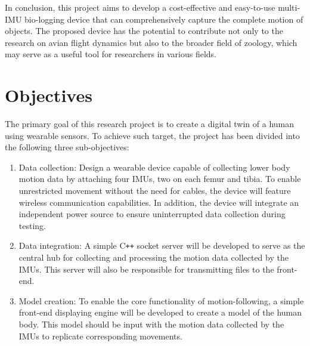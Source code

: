 In conclusion, this project aims to develop a cost-effective and easy-to-use multi-IMU bio-logging device that can comprehensively capture the complete motion of objects.
The proposed device has the potential to contribute not only to the research on avian flight dynamics but also to the broader field of zoology, which may serve as a useful tool for researchers in various fields.


\section{Objectives}
The primary goal of this research project is to create a digital twin of a human using wearable sensors.
To achieve such target, the project has been divided into the following three sub-objectives:
\begin{enumerate}\label{obj}
    \item \label{itm:obj-data-collection}Data collection:
    Design a wearable device capable of collecting lower body motion data by attaching four IMUs, two on each femur and tibia.
    To enable unrestricted movement without the need for cables, the device will feature wireless communication capabilities.
    In addition, the device will integrate an independent power source to ensure uninterrupted data collection during testing.

    \item \label{itm:obj-data-integration}Data integration:
    A simple C\texttt{++} socket server will be developed to serve as the central hub for collecting and processing the motion data collected by the IMUs.
    This server will also be responsible for transmitting files to the front-end.

    \item \label{itm:obj-model-creation} Model creation:
    To enable the core functionality of motion-following, a simple front-end displaying engine will be developed to create a model of the human body.
    This model should be input with the motion data collected by the IMUs to replicate corresponding movements.
\end{enumerate}


